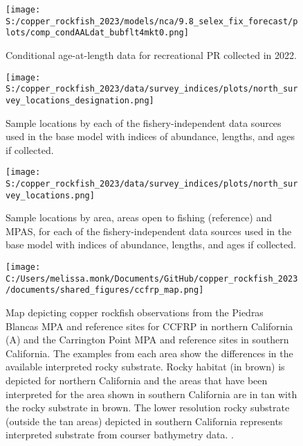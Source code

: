 \documentclass[11pt,
  english,
  letterpaper,
]{article}
\begin{document}
\pagebreak

\begin{figure}
\centering
\texttt{[image: S:/copper\_rockfish\_2023/models/nca/9.8\_selex\_fix\_forecast/plots/comp\_condAALdat\_bubflt4mkt0.png]}
\caption{Conditional age-at-length data for recreational PR collected in 2022.\label{fig:rec-pr-caal-data}}
\end{figure}

\pagebreak

\begin{figure}
\centering
\texttt{[image: S:/copper\_rockfish\_2023/data/survey\_indices/plots/north\_survey\_locations\_designation.png]}
\caption{Sample locations by each of the fishery-independent data sources used in the base model with indices of abundance, lengths, and ages if collected.\label{fig:survey-locations}}
\end{figure}

\pagebreak

\begin{figure}
\centering
\texttt{[image: S:/copper\_rockfish\_2023/data/survey\_indices/plots/north\_survey\_locations.png]}
\caption{Sample locations by area, areas open to fishing (reference) and MPAS, for each of the fishery-independent data sources used in the base model with indices of abundance, lengths, and ages if collected.\label{fig:ref-mpa}}
\end{figure}

\pagebreak

\begin{figure}
\centering
\texttt{[image: C:/Users/melissa.monk/Documents/GitHub/copper\_rockfish\_2023/documents/shared\_figures/ccfrp\_map.png]}
\caption{Map depicting copper rockfish observations from the Piedras Blancas MPA and reference sites for CCFRP in northern California (A) and the Carrington Point MPA and reference sites in southern California. The examples from each area show the differences in the available interpreted rocky substrate. Rocky habitat (in brown) is depicted for northern California and the areas that have been interpreted for the area shown in southern California are in tan with the rocky substrate in brown. The lower resolution rocky substrate (outside the tan areas) depicted in southern California represents interpreted substrate from courser bathymetry data. .\label{fig:ccfrp-map}}
\end{figure}
\end{document}
